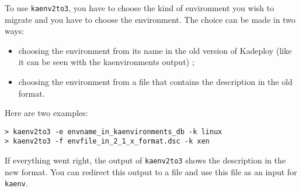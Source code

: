 \documentclass[a4wide,10pt,oneside]{book}
\begin{document}
To use \texttt{kaenv2to3}, you have to choose the kind of environment you wish to migrate and you have to choose the environment. The choice can be made in two ways:
\begin{itemize}
\item choosing the environment from its name in the old version of Kadeploy (like it can be seen with the kaenvironments output) ;
\item choosing the environment from a file that contains the description in the old format.
\end{itemize}

Here are two examples:
\begin{small}
\begin{verbatim}
> kaenv2to3 -e envname_in_kaenvironments_db -k linux
> kaenv2to3 -f envfile_in_2_1_x_format.dsc -k xen
\end{verbatim}
\end{small}

If everything went right, the output of \texttt{kaenv2to3} shows the description in the new format. You can redirect this output to a file and use this file as an input for \texttt{kaenv}.
\end{document}
